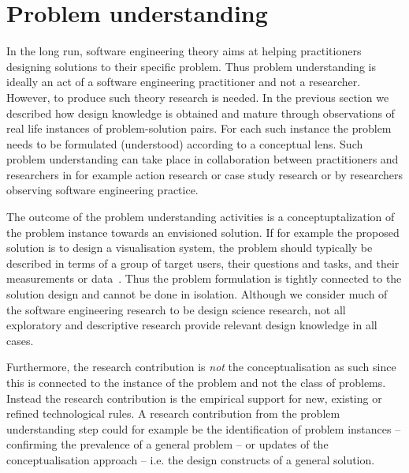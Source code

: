 \documentclass[graybox]{svmult}
\begin{document}
\section{Problem understanding}




In the long run, software engineering theory aims at helping practitioners designing solutions to their specific problem. Thus problem understanding is ideally an act of a software engineering practitioner and not a researcher. However, to produce such theory research is needed. In the previous section we described how design knowledge is obtained and mature through observations of real life instances of problem-solution pairs. For each such instance the problem needs to be formulated (understood) according to a conceptual lens. Such problem understanding can take place in collaboration between practitioners and researchers in for example action research or case study research or by researchers observing software engineering practice.


The outcome of the problem understanding activities is a conceptuptalization of the problem instance towards an envisioned solution. If for example the proposed solution is to design a visualisation system, the problem should typically be described in terms of a group of target users, their questions and tasks, and their measurements or data~\cite{meyer_nested_2015}. Thus the problem formulation is tightly connected to the solution design and cannot be done in isolation. Although we consider much of the software engineering research to be design science research, not all exploratory and descriptive research provide relevant design knowledge in all cases.


Furthermore, the research contribution is \emph{not} the conceptualisation as such since this is connected to the instance of the problem and not the class of problems. Instead the research contribution is the empirical support for new, existing or refined technological rules. A research contribution from the problem understanding step could for example be the identification of problem instances -- confirming the prevalence of a general problem -- or updates of the conceptualisation approach -- i.e. the design constructs of a general solution.
\end{document}
